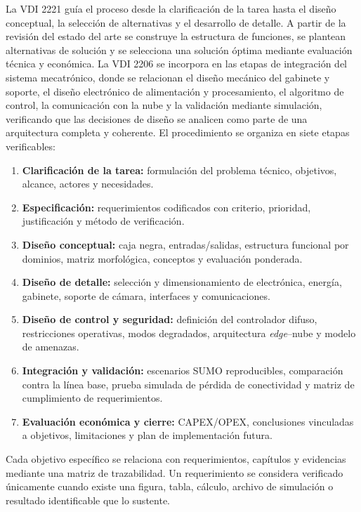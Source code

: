 La VDI 2221 guía el proceso desde la clarificación de la tarea hasta el diseño conceptual, la selección de
alternativas y el desarrollo de detalle. A partir de la revisión del estado del arte se construye la
estructura de funciones, se plantean alternativas de solución y se selecciona una solución óptima mediante
evaluación técnica y económica. La VDI 2206 se incorpora en las etapas de integración del sistema
mecatrónico, donde se relacionan el diseño mecánico del gabinete y soporte, el diseño electrónico de
alimentación y procesamiento, el algoritmo de control, la comunicación con la nube y la validación mediante
simulación, verificando que las decisiones de diseño se analicen como parte de una arquitectura completa y
coherente.
\newpage
El procedimiento se organiza en siete etapas verificables:
\begin{enumerate}
\item \textbf{Clarificación de la tarea:} formulación del problema técnico, objetivos, alcance, actores y
necesidades.
\item \textbf{Especificación:} requerimientos codificados con criterio, prioridad, justificación y método de
verificación.
\item \textbf{Diseño conceptual:} caja negra, entradas/salidas, estructura funcional por dominios, matriz
morfológica, conceptos y evaluación ponderada.
\item \textbf{Diseño de detalle:} selección y dimensionamiento de electrónica, energía, gabinete, soporte de
cámara, interfaces y comunicaciones.
\item \textbf{Diseño de control y seguridad:} definición del controlador difuso, restricciones operativas,
modos degradados, arquitectura \textit{edge}--nube y modelo de amenazas.
\item \textbf{Integración y validación:} escenarios SUMO reproducibles, comparación contra la línea base,
prueba simulada de pérdida de conectividad y matriz de cumplimiento de requerimientos.
\item \textbf{Evaluación económica y cierre:} CAPEX/OPEX, conclusiones vinculadas a objetivos, limitaciones
y plan de implementación futura.
\end{enumerate}

Cada objetivo específico se relaciona con requerimientos, capítulos y evidencias mediante una matriz de
trazabilidad. Un requerimiento se considera verificado únicamente cuando existe una figura, tabla, cálculo,
archivo de simulación o resultado identificable que lo sustente.

